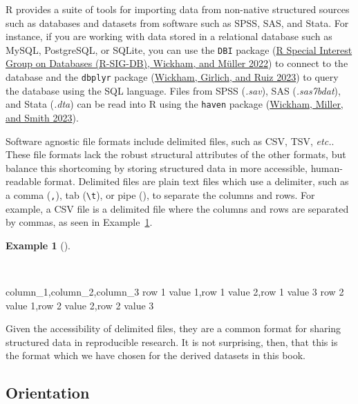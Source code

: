 \documentclass[
  letterpaper,
  DIV=11,
  numbers=noendperiod]{scrreport}
\newenvironment{Shaded}{\begin{snugshade}}{\end{snugshade}}
\newcommand{\NormalTok}[1]{\textcolor[rgb]{0.00,0.00,0.00}{#1}}
\theoremstyle{definition}
\newtheorem{example}{Example}[chapter]
\theoremstyle{remark}
\begin{document}
R provides a suite of tools for importing data from non-native
structured sources such as databases and datasets from software such as
SPSS, SAS, and Stata. For instance, if you are working with data stored
in a relational database such as MySQL, PostgreSQL, or SQLite, you can
use the \texttt{DBI} package (\protect\hyperlink{ref-R-DBI}{R Special
Interest Group on Databases (R-SIG-DB), Wickham, and Müller 2022}) to
connect to the database and the \texttt{dbplyr} package
(\protect\hyperlink{ref-R-dbplyr}{Wickham, Girlich, and Ruiz 2023}) to
query the database using the SQL language. Files from SPSS
(\emph{.sav}), SAS (\emph{.sas7bdat}), and Stata (\emph{.dta}) can be
read into R using the \texttt{haven} package
(\protect\hyperlink{ref-R-haven}{Wickham, Miller, and Smith 2023}).

Software agnostic file formats include delimited files, such as CSV,
TSV, \emph{etc.}. These file formats lack the robust structural
attributes of the other formats, but balance this shortcoming by storing
structured data in more accessible, human-readable format. Delimited
files are plain text files which use a delimiter, such as a comma
(\texttt{,}), tab (\texttt{\textbackslash{}t}), or pipe
(\texttt{\textbar{}}), to separate the columns and rows. For example, a
CSV file is a delimited file where the columns and rows are separated by
commas, as seen in Example~\ref{exm-cd-csv-example}.

\begin{example}[]\protect\hypertarget{exm-cd-csv-example}{}\label{exm-cd-csv-example}

~

\begin{Shaded}
\begin{Highlighting}[]
\NormalTok{column\_1,column\_2,column\_3}
\NormalTok{row 1 value 1,row 1 value 2,row 1 value 3}
\NormalTok{row 2 value 1,row 2 value 2,row 2 value 3}
\end{Highlighting}
\end{Shaded}

\end{example}

Given the accessibility of delimited files, they are a common format for
sharing structured data in reproducible research. It is not surprising,
then, that this is the format which we have chosen for the derived
datasets in this book.

\hypertarget{orientation-1}{%
\subsection{Orientation}\label{orientation-1}}
\end{document}
